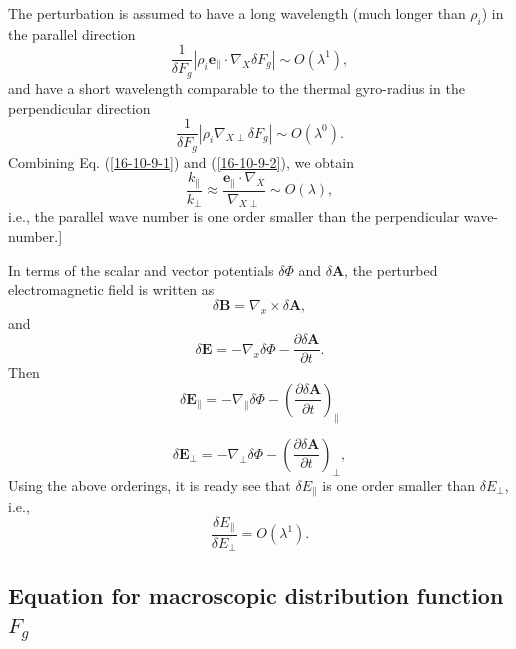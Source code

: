 \documentclass{article}
\begin{document}
The perturbation is assumed to have a long wavelength (much longer than
$\rho_i$) in the parallel direction
\begin{equation}
  \label{16-10-9-1} \frac{1}{\delta F_g} | \rho_i \mathbf{e}_{\parallel} \cdot
  \nabla_X \delta F_g | \sim O (\lambda^1),
\end{equation}
and have a short wavelength comparable to the thermal gyro-radius in the
perpendicular direction
\begin{equation}
  \label{16-10-9-2} \frac{1}{\delta F_g} | \rho_i \nabla_{X \perp} \delta F_g
  | \sim O (\lambda^0) .
\end{equation}
Combining Eq. (\ref{16-10-9-1}) and (\ref{16-10-9-2}), we obtain
\begin{equation}
  \frac{k_{\parallel}}{k_{\perp}} \approx \frac{\mathbf{e}_{\parallel} \cdot
  \nabla_X}{\nabla_{X \perp}} \sim O (\lambda),
\end{equation}
i.e., the parallel wave number is one order smaller than the perpendicular
wave-number.]

In terms of the scalar and vector potentials $\delta \Phi$ and $\delta
\mathbf{A}$, the perturbed electromagnetic field is written as
\begin{equation}
  \delta \mathbf{B}= \nabla_x \times \delta \mathbf{A},
\end{equation}
and
\begin{equation}
  \label{18-3-6-a7} \delta \mathbf{E}= - \nabla_x \delta \Phi - \frac{\partial
  \delta \mathbf{A}}{\partial t} .
\end{equation}
Then
\begin{equation}
  \delta \mathbf{E}_{\parallel} = - \nabla_{\parallel} \delta \Phi - \left(
  \frac{\partial \delta \mathbf{A}}{\partial t} \right)_{\parallel}
\end{equation}

\begin{equation}
  \delta \mathbf{E}_{\perp} = - \nabla_{\perp} \delta \Phi - \left(
  \frac{\partial \delta \mathbf{A}}{\partial t} \right)_{\perp},
\end{equation}
Using the above orderings, it is ready see that $\delta E_{\parallel}$ is one
order smaller than $\delta E_{\perp}$, i.e.,
\begin{equation}
  \frac{\delta E_{\parallel}}{\delta E_{\perp}} = O (\lambda^1) .
\end{equation}

\subsection{Equation for macroscopic distribution function $F_g$}
\end{document}
